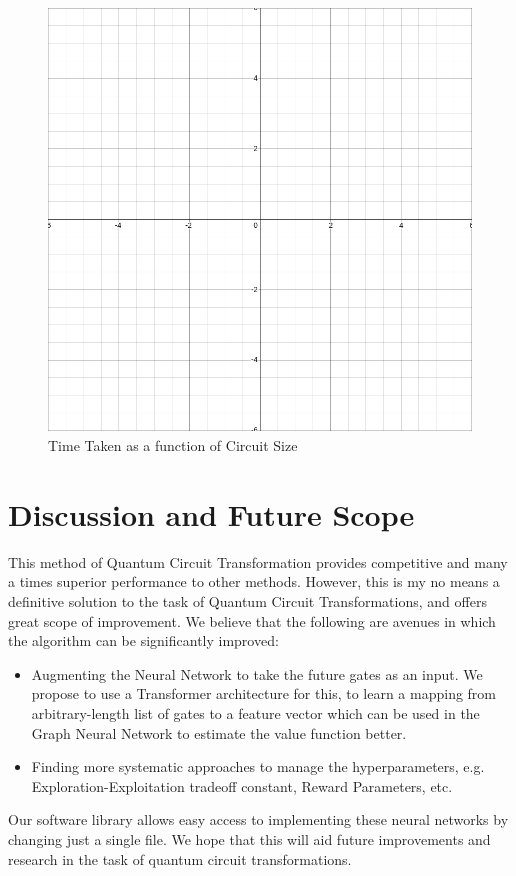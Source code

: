 \documentclass[%
 reprint,
 amsmath,amssymb,
 aps,
]{revtex4-2}
\begin{document}
\begin{figure}[H]
    \centering
    \includegraphics[width=0.6\linewidth]{images/dummy_plot.png}
    \caption{Time Taken as a function of Circuit Size}
    \label{fig:results-time}
\end{figure}

\section{Discussion and Future Scope}

This method of Quantum Circuit Transformation provides competitive and many a times superior performance to other methods. However, this is my no means a definitive solution to the task of Quantum Circuit Transformations, and offers great scope of improvement. We believe that the following are avenues in which the algorithm can be significantly improved:
\begin{itemize}
    \item Augmenting the Neural Network to take the future gates as an input. We propose to use a Transformer architecture for this, to learn a mapping from arbitrary-length list of gates to a feature vector which can be used in the Graph Neural Network to estimate the value function better.
    \item Finding more systematic approaches to manage the hyperparameters, e.g. Exploration-Exploitation tradeoff constant, Reward Parameters, etc.
\end{itemize}
Our software library allows easy access to implementing these neural networks by changing just a single file. We hope that this will aid future improvements and research in the task of quantum circuit transformations.

\appendix
\end{document}
